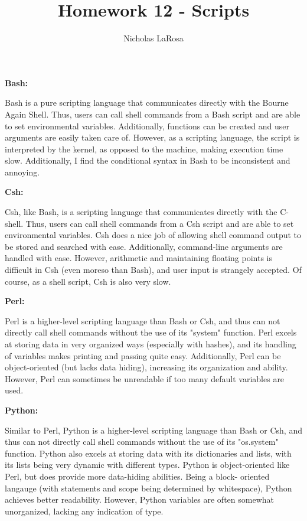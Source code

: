 \documentclass{article}
\begin{document}
\title{Homework 12 - Scripts}
\author{Nicholas LaRosa}

\maketitle

\large{\textbf{Bash:}}

Bash is a pure scripting language that communicates directly with the Bourne Again Shell. 
Thus, users can call shell commands from a Bash script and are able to set environmental variables.
Additionally, functions can be created and user arguments are easily taken care of. However,
as a scripting language, the script is interpreted by the kernel, as opposed to the machine,
making execution time slow. Additionally, I find the conditional syntax in Bash to be inconsistent
and annoying.

\large{\textbf{Csh:}}

Csh, like Bash, is a scripting language that communicates directly with the C-shell. Thus,
users can call shell commands from a Csh script and are able to set environmental variables.
Csh does a nice job of allowing shell command output to be stored and searched with ease. 
Additionally, command-line arguments are handled with ease. However, arithmetic and maintaining
floating points is difficult in Csh (even moreso than Bash), and user input is strangely accepted.
Of course, as a shell script, Csh is also very slow.

\large{\textbf{Perl:}}

Perl is a higher-level scripting language than Bash or Csh, and thus can not directly call
shell commands without the use of its "system" function. Perl excels at storing data in very organized
ways (especially with hashes), and its handling of variables makes printing and passing quite easy.
Additionally, Perl can be object-oriented (but lacks data hiding), increasing its organization and
ability. However, Perl can sometimes be unreadable if too many default variables are used.

\large{\textbf{Python:}}

Similar to Perl, Python is a higher-level scripting language than Bash or Csh, and thus can not 
directly call shell commands without the use of its "os.system" function. Python also excels at 
storing data with its dictionaries and lists, with its lists being very dynamic with different types.
Python is object-oriented like Perl, but does provide more data-hiding abilities. Being a block-
oriented langauge (with statements and scope being determined by whitespace), Python achieves
better readability. However, Python variables are often somewhat unorganized, lacking any indication of type.
\end{document}
